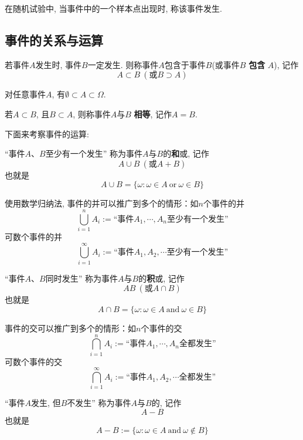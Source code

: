 在随机试验中, 当事件中的一个样本点出现时, 称该事件发生.

\subsection{事件的关系与运算}

\begin{definition}[事件的关系]
    若事件$A$发生时, 事件$B$一定发生. 则称事件$A$包含于事件$B$(或事件$B$ \textbf{包含} $A$), 记作
    $$A\subset B \ (\text{或}B\supset A)$$

    对任意事件$A$, 有$\emptyset \subset A\subset \Omega$.

    若$A\subset B$, 且$B\subset A$, 则称事件$A$与$B$ \textbf{相等}, 记作$A=B$.

\end{definition}

下面来考察事件的运算:

\begin{definition}[事件的并]

    ``事件$A$、$B$至少有一个发生''
    称为事件$A$与$B$的\textbf{和}或, 记作
    $$A\cup B \ (\text{或}A+B)$$
    也就是
    $$A\cup B=\{\omega : \omega\in A \ \text{or}\ \omega\in B\}$$
\end{definition}

\begin{remark}
    使用数学归纳法, 事件的并可以推广到多个的情形：如$n$个事件的并
    $$\bigcup_{i=1}^{n} A_i :=\text{``事件$A_1, \cdots, A_n$至少有一个发生''}$$
    可数个事件的并
    $$\bigcup_{i=1}^{\infty} A_i :=\text{``事件$A_1, A_2, \cdots$至少有一个发生''}$$
\end{remark}

\begin{definition}
    ``事件$A$、$B$同时发生''
    称为事件$A$与$B$的\textbf{积}或, 记作
    $$AB \ (\text{或}A\cap B)$$
    也就是$$A\cap B=\{\omega : \omega\in A \ \text{and}\ \omega\in B\}$$
\end{definition}

\begin{remark}
    事件的交可以推广到多个的情形：如$n$个事件的交
    $$\bigcap_{i=1}^{n} A_i :=\text{``事件$A_1, \cdots, A_n$全都发生''}$$
    可数个事件的交
    $$\bigcap_{i=1}^{\infty} A_i :=\text{``事件$A_1, A_2, \cdots$全都发生''}$$
\end{remark}

\begin{definition}
    ``事件$A$发生, 但$B$不发生''
    称为事件$A$与$B$的, 记作
    $$A-B$$
    也就是
    $$A- B:=\{\omega : \omega\in A \ \text{and}\ \omega\notin B\}$$
\end{definition}


